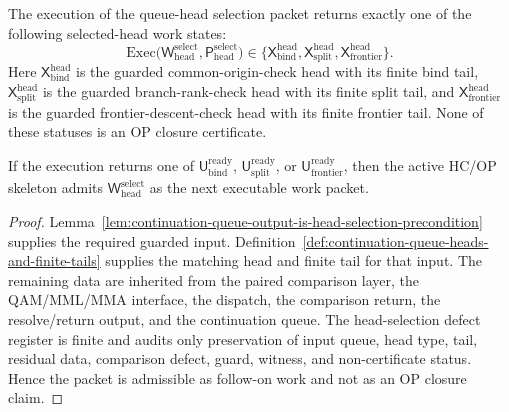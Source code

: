 \begin{definition}
\label{def:r23-queue-head-selection-output}
The execution of the queue-head selection packet returns exactly one of the following selected-head work states:
\[
\mathrm{Exec}\bigl(\mathsf W_{\mathrm{head}}^{\mathrm{select}},
 \mathsf P_{\mathrm{head}}^{\mathrm{select}}\bigr)
\in
\{\mathsf X_{\mathrm{bind}}^{\mathrm{head}},
 \mathsf X_{\mathrm{split}}^{\mathrm{head}},
 \mathsf X_{\mathrm{frontier}}^{\mathrm{head}}\}.
\]
Here \(\mathsf X_{\mathrm{bind}}^{\mathrm{head}}\) is the guarded common-origin-check head with its finite bind tail, \(\mathsf X_{\mathrm{split}}^{\mathrm{head}}\) is the guarded branch-rank-check head with its finite split tail, and \(\mathsf X_{\mathrm{frontier}}^{\mathrm{head}}\) is the guarded frontier-descent-check head with its finite frontier tail. None of these statuses is an OP closure certificate.
\end{definition}

\begin{proposition}
\label{prop:queue-head-selection-packet-admissible-after-r22-queue-return}
If the execution returns one of \(\mathsf U_{\mathrm{bind}}^{\mathrm{ready}}\), \(\mathsf U_{\mathrm{split}}^{\mathrm{ready}}\), or \(\mathsf U_{\mathrm{frontier}}^{\mathrm{ready}}\), then the active HC/OP skeleton admits \(\mathsf W_{\mathrm{head}}^{\mathrm{select}}\) as the next executable work packet.
\end{proposition}

\begin{proof}
Lemma~\ref{lem:continuation-queue-output-is-head-selection-precondition} supplies the required guarded input. Definition~\ref{def:continuation-queue-heads-and-finite-tails} supplies the matching head and finite tail for that input. The remaining data are inherited from the paired comparison layer, the QAM/MML/MMA interface, the dispatch, the comparison return, the resolve/return output, and the continuation queue. The head-selection defect register is finite and audits only preservation of input queue, head type, tail, residual data, comparison defect, guard, witness, and non-certificate status. Hence the packet is admissible as follow-on work and not as an OP closure claim.
\end{proof}

